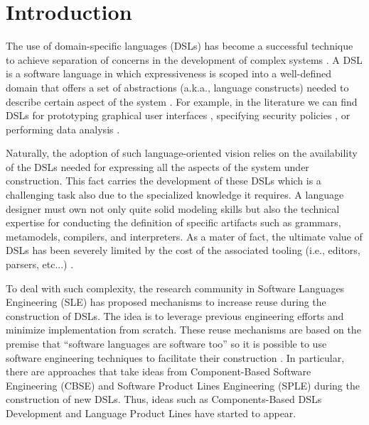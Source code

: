 \section{Introduction}
\label{sec:introduction}

The use of domain-specific languages (DSLs) has become a successful technique to achieve separation of concerns in the development of complex systems \cite{Cook:2006}. A DSL is a software language in which expressiveness is scoped into a well-defined domain that offers a set of abstractions (a.k.a., language constructs) needed to describe certain aspect of the system \cite{Combemale:2014}. For example, in the literature we can find DSLs for prototyping graphical user interfaces \cite{Oney:2012}, specifying security policies \cite{Lodderstedt:2002}, or performing data analysis \cite{Eberius:2012}. 

Naturally, the adoption of such language-oriented vision relies on the availability of the DSLs needed for expressing all the aspects of the system under construction. This fact carries the development of these DSLs which is a challenging task also due to the specialized knowledge it requires. A language designer must own not only quite solid modeling skills but also the technical expertise for conducting the definition of specific artifacts such as grammars, metamodels, compilers, and interpreters. As a mater of fact, the ultimate value of DSLs has been severely limited by the cost of the associated tooling (i.e., editors, parsers, etc...) \cite{jezequel:2014}.

To deal with such complexity, the research community in Software Languages Engineering (SLE) has proposed mechanisms to increase reuse during the construction of DSLs. The idea is to leverage previous engineering efforts and minimize implementation from scratch. These reuse mechanisms are based on the premise that ``software languages are software too'' \cite{Favre:2011} so it is possible to use software engineering techniques to facilitate their construction \cite{Kleppe:2009}. In particular, there are approaches that take ideas from Component-Based Software Engineering (CBSE) and Software Product Lines Engineering (SPLE) during the construction of new DSLs. Thus, ideas such as Components-Based DSLs Development\cite{Cleenewerck:2003} and Language Product Lines \cite{Zschaler:2010} have started to appear.

